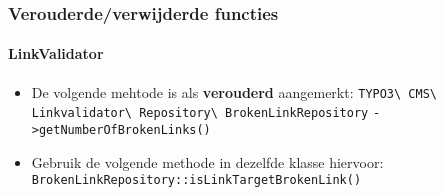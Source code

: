 %
%
%
%
%
%
%
%
%

\begin{frame}[fragile]
	\frametitle{Verouderde/verwijderde functies}
	\framesubtitle{LinkValidator}

	\begin{itemize}
		\item De volgende mehtode is als \textbf{verouderd} aangemerkt:
		\newline\newline
			\smaller
				\texttt{TYPO3\textbackslash
					CMS\textbackslash
					Linkvalidator\textbackslash
					Repository\textbackslash
					BrokenLinkRepository}\newline
				\texttt{->getNumberOfBrokenLinks()}\normalsize\newline

		\item Gebruik de volgende methode in dezelfde klasse hiervoor:\newline
			\small\texttt{BrokenLinkRepository::isLinkTargetBrokenLink()}\normalsize

	\end{itemize}

\end{frame}


